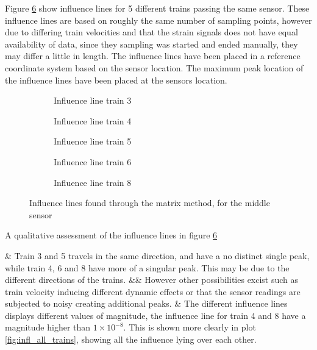 Figure \ref{fig:Influence_lines} show influence lines for 5 different trains passing the same sensor. These influence lines are based on roughly the same number of sampling points, however due to differing train velocities and that the strain signals does not have equal availability of data, since they sampling was started and ended manually, they may differ a little in length. The influence lines have been placed in a reference coordinate system based on the sensor location. The maximum peak location of the influence lines have been placed at the sensors location.
	\begin{figure}[H]
		\centering
		\begin{subfigure}[t]{0.43\textwidth}
			\centering
			
			\caption{Influence line train 3}
			\label{fig:train3}
		\end{subfigure}
		\qquad \qquad
		\begin{subfigure}[t]{0.43\textwidth}
			\centering
			
			\caption{Influence line train 4}
			\label{fig:train4}
		\end{subfigure}
		\centering
		\begin{subfigure}[t]{0.43\textwidth}
			\centering
			
			\caption{Influence line train 5}
			\label{fig:train5}
		\end{subfigure}
		\qquad \qquad
		\begin{subfigure}[t]{0.43\textwidth}
			\centering
			
			\caption{Influence line train 6}
			\label{fig:train6}
		\end{subfigure}
		\centering
		\begin{subfigure}[t]{0.97\textwidth}
			\centering
			
			\caption{Influence line train 8}
			\label{fig:train8}
		\end{subfigure}

		\caption{Influence lines found through the matrix method, for the middle sensor}
		\label{fig:Influence_lines}
	\end{figure}
A qualitative assessment of the influence lines in figure \ref{fig:Influence_lines}
\begin{easylist}[itemize]
	& Train 3 and 5 travels in the same direction, and have a no distinct single peak, while train 4, 6 and 8 have more of a singular peak. This may be due to the different directions of the trains.
	&& However other possibilities excist such as train velocity inducing different dynamic effects or that the sensor readings are subjected to noisy creating additional peaks.
	& The different influence lines displays different values of magnitude, the influence line for train 4 and 8 have a magnitude higher than $ 1 \times 10^{-8} $. This is shown more clearly in plot \ref{fig:infl_all_trains}, showing all the influence lying over each other.
\end{easylist}

